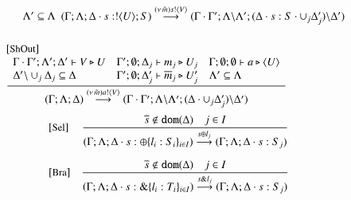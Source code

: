 \begin{figure}[t]
\[\begin{array}{l}
{\begin{array}{lll}
& 
				\Lambda' \subseteq \Lambda
			\end{array}
		}{
			(\Gamma; \Lambda; \Delta \cat s: \btout{U} S) \by{\news{\tilde{m}} \bactout{s}{V}} (\Gamma \cat \Gamma'; \Lambda\backslash\Lambda';
			(\Delta \cat s: S \cat \cup_j \Delta_j') \backslash \Delta')
		}
\\[6mm]
\eltsrule{ShOut}\\
\tree{
		\begin{array}{lll}
			\Gamma \cat \Gamma' ; \Lambda'; \Delta' \proves V \hastype U &  
		\Gamma'; \es; \Delta_j \proves m_j \hastype U_j
& \Gamma ; \es ; \es \proves a \hastype \chtype{U}
				\\
			\Delta'\backslash \cup_j \Delta_j 
                         \subseteq \Delta
& 
		\Gamma'; \es; \Delta_j' \proves \dual{m}_j\hastype U_j'
& 
				\Lambda' \subseteq \Lambda
			\end{array}
		}{
			(\Gamma ; \Lambda; \Delta) \by{\news{\tilde{m}} \bactout{a}{V}} (\Gamma \cat \Gamma' ; \Lambda\backslash\Lambda';
			(\Delta \cat \cup_j \Delta_j') \backslash \Delta')
		}
\end{array}
\]
\[
\begin{array}{lc}
		\eltsrule{Sel}&\tree{
			\dual{s} \notin \dom{\Delta} \quad j \in I
		}{
			(\Gamma; \Lambda; \Delta \cat s: \btsel{l_i: S_i}_{i \in I}) \by{\bactsel{s}{l_j}} (\Gamma; \Lambda; \Delta \cat s:S_j)
		}
\\[8mm]
		\eltsrule{Bra}&\tree{
			\dual{s} \notin \dom{\Delta} \quad j \in I
		}{
			(\Gamma; \Lambda; \Delta \cat s: \btbra{l_i: T_i}_{i \in I}) \by{\bactbra{s}{l_j}} (\Gamma; \Lambda; \Delta \cat s:S_j)
}
\end{array}\]
\end{figure}
